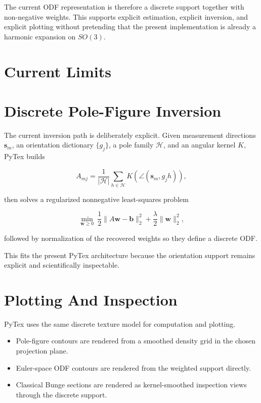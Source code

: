 \documentclass[11pt]{article}
\begin{document}
The current ODF representation is therefore a discrete support together with non-negative weights.
This supports explicit estimation, explicit inversion, and explicit plotting without pretending that
the present implementation is already a harmonic expansion on $SO(3)$.

\section{Current Limits}

\section{Discrete Pole-Figure Inversion}

The current inversion path is deliberately explicit. Given measurement directions $\mathbf{s}_m$, an orientation dictionary $\{g_j\}$, a pole family $\mathcal{H}$, and an angular kernel $K$, PyTex builds

\[
  A_{mj} = \frac{1}{|\mathcal{H}|}\sum_{h \in \mathcal{H}} K\!\left(\angle(\mathbf{s}_m, g_j h)\right),
\]

then solves a regularized nonnegative least-squares problem

\[
  \min_{\mathbf{w} \ge 0}\ \frac{1}{2}\lVert A\mathbf{w} - \mathbf{b}\rVert_2^2 + \frac{\lambda}{2}\lVert \mathbf{w}\rVert_2^2,
\]

followed by normalization of the recovered weights so they define a discrete ODF.

This fits the present PyTex architecture because the orientation support remains explicit and scientifically inspectable.

\section{Plotting And Inspection}

PyTex uses the same discrete texture model for computation and plotting.

\begin{itemize}
  \item Pole-figure contours are rendered from a smoothed density grid in the chosen projection plane.
  \item Euler-space ODF contours are rendered from the weighted support directly.
  \item Classical Bunge sections are rendered as kernel-smoothed inspection views through the discrete support.
\end{itemize}
\end{document}
